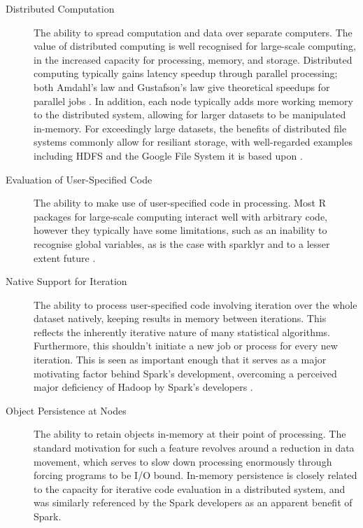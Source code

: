 \begin{description}
  \item[Distributed Computation]
    The ability to spread computation and data over separate computers. The
    value of distributed computing is well recognised for large-scale
    computing, in the increased capacity for processing, memory, and
    storage. Distributed computing typically gains latency speedup through
    parallel processing; both Amdahl's law and Gustafson's law give
    theoretical speedups for parallel jobs \cite{amdahl1967law}
    \cite{gustafson1988law}. In addition, each node typically adds more working
    memory to the distributed system, allowing for larger datasets to be
    manipulated in-memory. For exceedingly large datasets, the benefits of
    distributed file systems commonly allow for resiliant storage, with
    well-regarded examples including HDFS and the Google File System it is
    based upon \cite{shvachko2010hadoop}\cite{ghemawat2003google}.
  \item[Evaluation of User-Specified Code]
    The ability to make use of user-specified code in processing. Most R
    packages for large-scale computing interact well with arbitrary code,
    however they typically have some limitations, such as an inability to
    recognise global variables, as is the case with sparklyr and to a lesser
    extent future \cite{sparklyr2020limitations}\cite{microsoft20}.
  \item[Native Support for Iteration]
    The ability to process user-specified code involving iteration over the
    whole dataset natively, keeping results in memory between iterations.
    This reflects the inherently iterative nature of many statistical
    algorithms. Furthermore, this shouldn't initiate a new job or process
    for every new iteration. This is seen as important enough that it serves
    as a major motivating factor behind Spark's development, overcoming a
    perceived major deficiency of Hadoop by Spark's developers
    \cite{zaharia2010spark}.
  \item[Object Persistence at Nodes]
    The ability to retain objects in-memory at their point of processing.
    The standard motivation for such a feature revolves around a reduction
    in data movement, which serves to slow down processing enormously
    through forcing programs to be I/O bound. In-memory persistence is
    closely related to the capacity for iterative code evaluation in a
    distributed system, and was similarly referenced by the Spark developers
    as an apparent benefit of Spark\cite{zaharia2010spark}.

\end{description}
